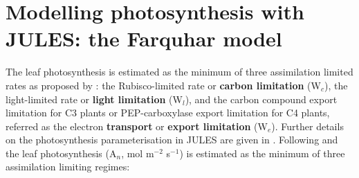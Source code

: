 \section{Modelling photosynthesis with JULES: the Farquhar model}

The leaf photosynthesis is estimated as the minimum of three assimilation limited rates as proposed by \citet{Farquhar1980}: the Rubisco-limited rate or \textbf{carbon limitation} (W$_c$), the light-limited rate or \textbf{light limitation} (W$_l$), and the carbon compound export limitation for C3 plants or PEP-carboxylase export limitation for C4 plants, referred as the electron \textbf{transport} or \textbf{export limitation} (W$_e$). Further details on the photosynthesis parameterisation in JULES are given in \citet{Clark2011}. Following \citet{Collatz1991,Collatz1992} and \citet{Oleson2010} the leaf photosynthesis (A$_n$, mol m$^{-2}$ s$^{-1}$) is estimated as the minimum of three assimilation limiting regimes:
